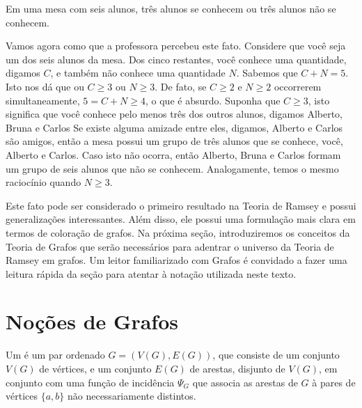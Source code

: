 \begin{fact}
Em uma mesa com seis alunos, três alunos se conhecem ou três alunos não se conhecem.
\end{fact}

Vamos agora como que a professora percebeu este fato. Considere que você seja um dos seis alunos da mesa. Dos cinco restantes, você conhece uma quantidade, digamos $C$, e também não conhece uma quantidade $N$. Sabemos que $C + N = 5$. Isto nos dá que ou $C \geq 3$ ou $N \geq 3$. De fato, se $C \geq 2$ e $N \geq 2$ occorrerem simultaneamente, $5 = C + N \geq 4$, o que é absurdo. Suponha que $C \geq 3$, isto significa que você conhece pelo menos três dos outros alunos, digamos Alberto, Bruna e Carlos Se existe alguma amizade entre eles, digamos, Alberto e Carlos são amigos, então a mesa possui um grupo de três alunos que se conhece, você, Alberto e Carlos. Caso isto não ocorra, então Alberto, Bruna e Carlos formam um grupo de seis alunos que não se conhecem. Analogamente, temos o mesmo raciocínio quando $N \geq 3$.

Este fato pode ser considerado o primeiro resultado na Teoria de Ramsey e possui generalizações interessantes. Além disso, ele possui uma formulação mais clara em termos de coloração de grafos. Na próxima seção, introduziremos os conceitos da Teoria de Grafos que serão necessários para adentrar o universo da Teoria de Ramsey em grafos. Um leitor familiarizado com Grafos é convidado a fazer uma leitura rápida da seção para atentar à notação utilizada neste texto.




\section{Noções de Grafos}

Um  é um par ordenado $G = (V(G), E(G))$, que consiste de um conjunto $V(G)$ de vértices, e um conjunto $E(G)$ de arestas, disjunto de $V(G)$, em conjunto com uma função de incidência $\Psi_G$ que associa as arestas de $G$ à pares de vértices $\{a,b\}$ não necessariamente distintos.

